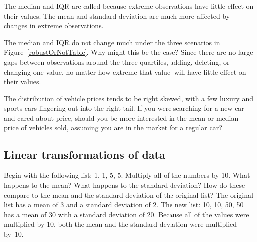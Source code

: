 The median and IQR are called  because extreme observations have little effect on their values. The mean and standard deviation are much more affected by changes in extreme observations.

\begin{examplewrap}
\begin{nexample}{The median and IQR do not change much under the three scenarios in Figure~\ref{robustOrNotTable}. Why might this be the case?}
Since there are no large gaps between observations around the three quartiles, adding, deleting, or changing one value, no matter how extreme that value, will have little effect on their values.
\end{nexample}
\end{examplewrap}

\begin{exercisewrap}
\begin{nexercise}
The distribution of vehicle prices tends to be right skewed, with a few luxury and sports cars lingering out into the right tail. If you were searching for a new car and cared about price, should you be more interested in the mean or median price of vehicles sold, assuming you are in the market for a regular car?\footnotemark\end{nexercise}
\end{exercisewrap}

\B{\newpage}
\subsection{Linear transformations of data}
\label{linearTransformationOfData}

\begin{examplewrap}
\begin{nexample}{Begin with the following list:  {1, 1, 5, 5}. Multiply all of the numbers by 10. What happens to the mean? What happens to the standard deviation? How do these compare to the mean and the standard deviation of the original list?}
The original list has a mean of 3 and a standard deviation of 2. The new list: {10, 10, 50, 50} has a mean of 30 with a standard deviation of 20. Because all of the values were multiplied by 10, both the mean and the standard deviation were multiplied by~10.~\footnotemark
\end{nexample}
\end{examplewrap}

